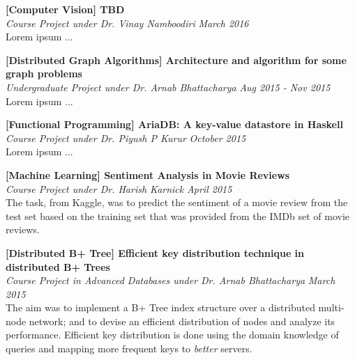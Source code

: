 \documentclass[margin,10pt]{resume}
\begin{document}
\begin{resume}
\begin{list2}
	\vspace{4mm}

\item \textbf{[Computer Vision] TBD}\\
	\textsl{Course Project under Dr. Vinay Namboodiri} \hfill \emph{March 2016}\\
	Lorem ipsum ...

	\vspace{4mm}

\item \textbf{[Distributed Graph Algorithms] Architecture and algorithm for some graph problems}\\
	\textsl{Undergraduate Project under Dr. Arnab Bhattacharya} \hfill \emph{Aug 2015 - Nov 2015}\\
	Lorem ipsum ...

	\vspace{4mm}

\item \textbf{[Functional Programming] AriaDB: A key-value datastore in Haskell}\\
	\textsl{Course Project under Dr. Piyush P Kurur} \hfill \emph{October 2015}\\
	Lorem ipsum ...

	\vspace{4mm}

\item \textbf{[Machine Learning] Sentiment Analysis in Movie Reviews}\\
	\textsl{Course Project under Dr. Harish Karnick} \hfill \emph{April 2015}\\
	The task, from Kaggle, was to predict the sentiment of a movie review from the test set based on the training set that was provided from the IMDb set of movie reviews.

	\vspace{4mm}

\item \textbf{[Distributed B+ Tree] Efficient key distribution technique in distributed B+ Trees}\\
	\textsl{Course Project in Advanced Databases under Dr. Arnab Bhattacharya} \hfill \emph{March 2015}\\
	The aim was to implement a B+ Tree index structure over a distributed multi-node network; and to devise an efficient distribution of nodes and analyze its performance. Efficient key distribution is done using the domain knowledge of queries and mapping more frequent keys to \textit{better} servers.


\end{list2}
\end{resume}
\end{document}
